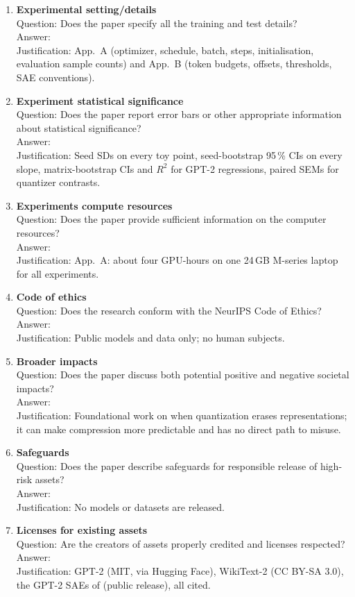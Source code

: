 \begin{enumerate}
\item {\bf Experimental setting/details} \\ Question: Does the paper specify all the training and test details? \\ Answer: \answerYes{} \\ Justification: App.~A (optimizer, schedule, batch, steps, initialisation, evaluation sample counts) and App.~B (token budgets, offsets, thresholds, SAE conventions).
\item {\bf Experiment statistical significance} \\ Question: Does the paper report error bars or other appropriate information about statistical significance? \\ Answer: \answerYes{} \\ Justification: Seed SDs on every toy point, seed-bootstrap 95\,\% CIs on every slope, matrix-bootstrap CIs and $R^2$ for GPT-2 regressions, paired SEMs for quantizer contrasts.
\item {\bf Experiments compute resources} \\ Question: Does the paper provide sufficient information on the computer resources? \\ Answer: \answerYes{} \\ Justification: App.~A: about four GPU-hours on one 24\,GB M-series laptop for all experiments.
\item {\bf Code of ethics} \\ Question: Does the research conform with the NeurIPS Code of Ethics? \\ Answer: \answerYes{} \\ Justification: Public models and data only; no human subjects.
\item {\bf Broader impacts} \\ Question: Does the paper discuss both potential positive and negative societal impacts? \\ Answer: \answerNA{} \\ Justification: Foundational work on when quantization erases representations; it can make compression more predictable and has no direct path to misuse.
\item {\bf Safeguards} \\ Question: Does the paper describe safeguards for responsible release of high-risk assets? \\ Answer: \answerNA{} \\ Justification: No models or datasets are released.
\item {\bf Licenses for existing assets} \\ Question: Are the creators of assets properly credited and licenses respected? \\ Answer: \answerYes{} \\ Justification: GPT-2 (MIT, via Hugging Face), WikiText-2 (CC BY-SA 3.0), the GPT-2 SAEs of \cite{bloom2024sae} (public release), all cited.

\end{enumerate}
